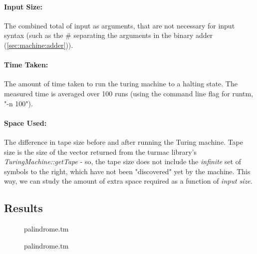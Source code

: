 \documentclass[]{article}
\begin{document}
\paragraph{Input Size:} The combined total of input as arguments, that are not necessary for input syntax (such as the \# separating the arguments in the binary adder (\ref{sec:machine:adder})).
\paragraph{Time Taken:} The amount of time taken to run the turing machine to a halting state. The measured time is averaged over 100 runs (using the command line flag for runtm, "-n 100").
\paragraph{Space Used:} The difference in tape size before and after running the Turing machine. Tape size is the size of the vector returned from the turmac library's \emph{TuringMachine::getTape} - so, the tape size does not include the \emph{infinite} set of symbols to the right, which have not been "discovered" yet by the machine. This way, we can study the amount of extra space required as a function of \emph{input size}.

\subsection{Results}

\begin{figure}[!htbp]
	\centering
	\begin{minipage}[b]{0.4\textwidth}
		\caption{palindrome.tm\label{fig:palindrome:time}}
	\end{minipage}
	\hfill
	\begin{minipage}[b]{0.4\textwidth}
		\caption{palindrome.tm\label{fig:palindrome:space}}
	\end{minipage}
\end{figure}
\end{document}
